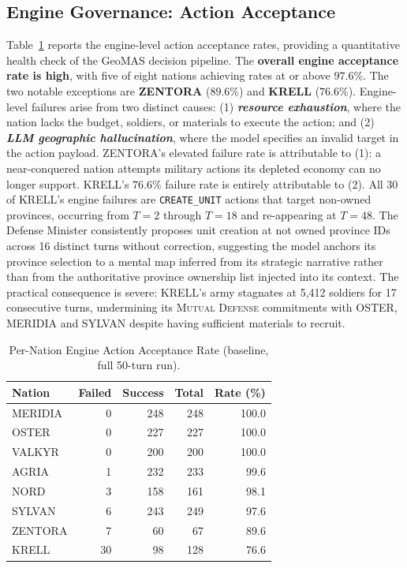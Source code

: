 \subsection{Engine Governance: Action Acceptance}
Table~\ref{tab:engine_acceptance} reports the engine-level action acceptance rates, providing a quantitative health check of the GeoMAS decision pipeline. The \textbf{overall engine acceptance rate is high}, with five of eight nations achieving rates at or above $97.6\%$. The two notable exceptions are \textbf{ZENTORA} ($89.6\%$) and \textbf{KRELL} ($76.6\%$). Engine-level failures arise from two distinct causes: (1) \textbf{\emph{resource exhaustion}}, where the nation lacks the budget, soldiers, or materials to execute the action; and (2) \textbf{\emph{LLM geographic hallucination}}, where the model specifies an invalid target in the action payload. ZENTORA's elevated failure rate is attributable to (1): a near-conquered nation attempts military actions its depleted economy can no longer support. KRELL's $76.6\%$ failure rate is entirely attributable to (2). All 30 of KRELL's engine failures are \texttt{CREATE\_UNIT} actions that target non-owned provinces, occurring from $T=2$ through $T=18$ and re-appearing at $T=48$. The Defense Minister consistently proposes unit creation at not owned province IDs across 16 distinct turns without correction, suggesting the model anchors its province selection to a mental map inferred from its strategic narrative rather than from the authoritative province ownership list injected into its context. The practical consequence is severe: KRELL's army stagnates at 5,412 soldiers for 17 consecutive turns, undermining its \textsc{Mutual Defense} commitments with OSTER, MERIDIA and SYLVAN despite having sufficient materials to recruit.

\begin{table}[!htb]
    \centering
    \caption{Per-Nation Engine Action Acceptance Rate (baseline, full 50-turn run).}
    \label{tab:engine_acceptance}
    \begin{tabular}{lrrrr}
        \hline
        \textbf{Nation} & \textbf{Failed} & \textbf{Success} & \textbf{Total} & \textbf{Rate (\%)} \\
        \hline
        MERIDIA & 0  & 248 & 248 & 100.0 \\
        OSTER   & 0  & 227 & 227 & 100.0 \\
        VALKYR  & 0  & 200 & 200 & 100.0 \\
        AGRIA   & 1  & 232 & 233 & 99.6  \\
        NORD    & 3  & 158 & 161 & 98.1  \\
        SYLVAN  & 6  & 243 & 249 & 97.6  \\
        ZENTORA & 7  & 60  & 67  & 89.6  \\
        KRELL   & 30 & 98  & 128 & 76.6  \\
        \hline
    \end{tabular}
\end{table}
